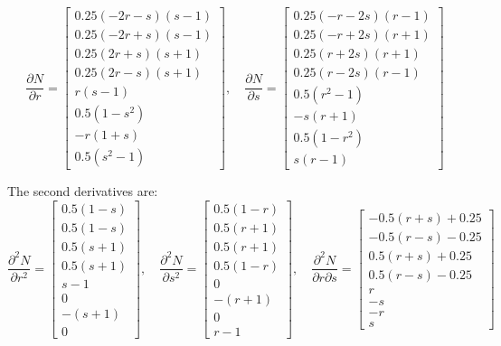 \[
\frac{\partial N}{\partial r} =
\begin{bmatrix}
0.25(-2r - s)(s - 1) \\
0.25(-2r + s)(s - 1) \\
0.25(2r + s)(s + 1) \\
0.25(2r - s)(s + 1) \\
r(s - 1) \\
0.5(1 - s^2) \\
-r(1 + s) \\
0.5(s^2 - 1)
\end{bmatrix}, \quad
\frac{\partial N}{\partial s} =
\begin{bmatrix}
0.25(-r - 2s)(r - 1) \\
0.25(-r + 2s)(r + 1) \\
0.25(r + 2s)(r + 1) \\
0.25(r - 2s)(r - 1) \\
0.5(r^2 - 1) \\
-s(r + 1) \\
0.5(1 - r^2) \\
s(r - 1)
\end{bmatrix}
\]

The second derivatives are:
\[
\frac{\partial^2 N}{\partial r^2} =
\begin{bmatrix}
0.5 (1 - s) \\
0.5 (1 - s) \\
0.5 (s + 1) \\
0.5 (s + 1) \\
s - 1 \\
0 \\
- (s + 1) \\
0
\end{bmatrix}, \quad
\frac{\partial^2 N}{\partial s^2} =
\begin{bmatrix}
0.5 (1 - r) \\
0.5 (r + 1) \\
0.5 (r + 1) \\
0.5 (1 - r) \\
0 \\
-(r + 1) \\
0 \\
r - 1
\end{bmatrix}, \quad
\frac{\partial^2 N}{\partial r \partial s} =
\begin{bmatrix}
-0.5 (r + s) + 0.25 \\
-0.5 (r - s) - 0.25 \\
0.5 (r + s) + 0.25 \\
0.5 (r - s) - 0.25 \\
r \\
-s \\
-r \\
s
\end{bmatrix}
\]


